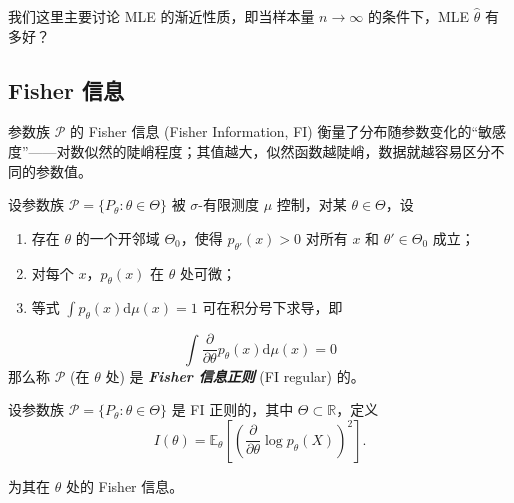 我们这里主要讨论 MLE 的渐近性质，即当样本量 $n\to\infty$ 的条件下，MLE $\widehat\theta$ 有多好？

\subsection{Fisher 信息}

参数族 $\mathscr P$ 的 Fisher 信息 (Fisher Information, FI) 衡量了分布随参数变化的``敏感度''------对数似然的陡峭程度；其值越大，似然函数越陡峭，数据就越容易区分不同的参数值。

\begin{definition*}
设参数族 $\mathscr{P}=\{P_\theta:\theta\in\Theta\}$ 被 $\sigma$-有限测度 $\mu$ 控制，对某 $\theta\in\Theta$，设

\begin{enumerate}
\def\labelenumi{\arabic{enumi}.}
\tightlist
\item
  存在 $\theta$ 的一个开邻域 $\Theta_0$，使得 $p_{\theta'}(x)>0$ 对所有 $x$ 和 $\theta'\in\Theta_0$ 成立；
\item
  对每个 $x$，$p_\theta(x)$ 在 $\theta$ 处可微；
\item
  等式 $\int p_\theta(x)\mathrm d\mu(x)=1$ 可在积分号下求导，即
\end{enumerate}
\[\int\frac{\partial}{\partial\theta}p_\theta(x)\mathrm d\mu(x)=0\]
那么称 $\mathscr P$ (在 $\theta$ 处) 是 \textbf{\emph{Fisher 信息正则}} (FI regular) 的。
\end{definition*}

\begin{definition*}[Fisher 信息]
设参数族 $\mathscr{P}=\{P_\theta:\theta\in\Theta\}$ 是 FI 正则的，其中 $\Theta\subset\mathbb R$，定义
\[
I(\theta)=\mathbb{E}_\theta\left[\left(\frac{\partial}{\partial\theta}\log p_\theta(X)\right)^2\right].
\]

为其在 $\theta$ 处的 Fisher 信息。
\end{definition*}

